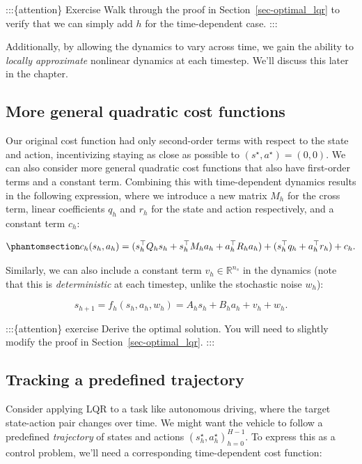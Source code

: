 \documentclass[
  letterpaper,
  DIV=11,
  numbers=noendperiod]{scrreprt}
\theoremstyle{plain}
\theoremstyle{plain}
\theoremstyle{definition}
\theoremstyle{definition}
\theoremstyle{remark}
\begin{document}
:::\{attention\} Exercise Walk through the proof in
Section~\ref{sec-optimal_lqr} to verify that we can simply add \(h\) for
the time-dependent case. :::

Additionally, by allowing the dynamics to vary across time, we gain the
ability to \emph{locally approximate} nonlinear dynamics at each
timestep. We'll discuss this later in the chapter.

\subsection{More general quadratic cost
functions}\label{more-general-quadratic-cost-functions}

Our original cost function had only second-order terms with respect to
the state and action, incentivizing staying as close as possible to
\((s^\star, a^\star) = (0, 0)\). We can also consider more general
quadratic cost functions that also have first-order terms and a constant
term. Combining this with time-dependent dynamics results in the
following expression, where we introduce a new matrix \(M_h\) for the
cross term, linear coefficients \(q_h\) and \(r_h\) for the state and
action respectively, and a constant term \(c_h\):

\begin{equation}\phantomsection\label{eq-general_quadratic_cost}{
c_h(s_h, a_h) = ( s_h^\top Q_hs_h+ s_h^\top M_ha_h+ a_h^\top R_ha_h) + (s_h^\top q_h+ a_h^\top r_h) + c_h.
}\end{equation}

Similarly, we can also include a constant term
\(v_h\in \mathbb{R}^{n_s}\) in the dynamics (note that this is
\emph{deterministic} at each timestep, unlike the stochastic noise
\(w_h\)):

\[
s_{h+1} = f_h(s_h, a_h, w_h) = A_hs_h+ B_ha_h+ v_h+ w_h.
\]

:::\{attention\} exercise Derive the optimal solution. You will need to
slightly modify the proof in Section~\ref{sec-optimal_lqr}. :::

\subsection{Tracking a predefined
trajectory}\label{tracking-a-predefined-trajectory}

Consider applying LQR to a task like autonomous driving, where the
target state-action pair changes over time. We might want the vehicle to
follow a predefined \emph{trajectory} of states and actions
\((s_h^\star, a_h^\star)_{h=0}^{H-1}\). To express this as a control
problem, we'll need a corresponding time-dependent cost function:
\end{document}
